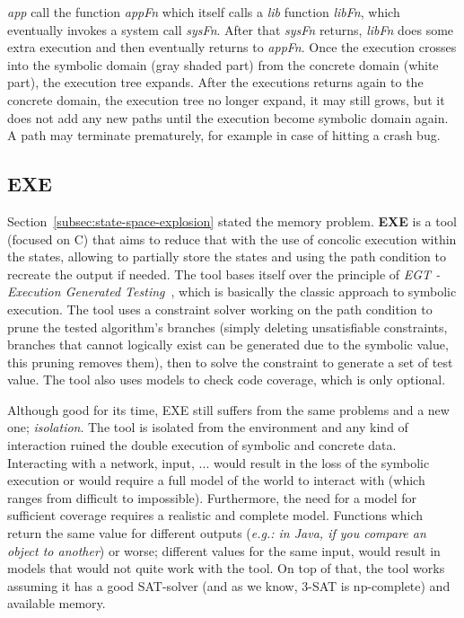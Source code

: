 \documentclass[11pt]{IEEEtran}
\begin{document}
    		\emph{app} call the function \emph{appFn} which itself calls a \emph{lib} function \emph{libFn}, which eventually invokes a system call \emph{sysFn}. After that \emph{sysFn} returns, \emph{libFn} does some extra execution and then eventually returns to \emph{appFn}. Once the execution crosses into the symbolic domain (gray shaded part) from the concrete domain (white part), the execution tree expands. After the executions returns again to the concrete domain, the execution tree no longer expand, it may still grows, but it does not add any new paths until the execution become symbolic domain again. A path may terminate prematurely, for example in case of hitting a crash bug.


    \subsection{EXE}
      Section~\ref{subsec:state-space-explosion} stated the memory problem. \textbf{EXE} is a tool (focused on C) that aims to reduce that with the use of concolic execution within the states, allowing to partially store the states and using the path condition to recreate the output if needed. The tool bases itself over the principle of \emph{EGT - Execution Generated Testing}~\cite{exe}, which is basically the classic approach to symbolic execution. The tool uses a constraint solver working on the path condition to prune the tested algorithm's branches (simply deleting unsatisfiable constraints, branches that cannot logically exist can be generated due to the symbolic value, this pruning removes them), then to solve the constraint to generate a set of test value. The tool also uses models to check code coverage, which is only optional.

      Although good for its time, EXE still suffers from the same problems and a new one; \emph{isolation}. The tool is isolated from the environment and any kind of interaction ruined the double execution of symbolic and concrete data. Interacting with a network, input, ... would result in the loss of the symbolic execution or would require a full model of the world to interact with (which ranges from difficult to impossible). Furthermore, the need for a model for sufficient coverage requires a realistic and complete model. Functions which return the same value for different outputs (\emph{e.g.: in Java, if you compare an object to another}) or worse; different values for the same input, would result in models that would not quite work with the tool. On top of that, the tool works assuming it has a good SAT-solver (and as we know, 3-SAT is np-complete) and available memory.
\end{document}
